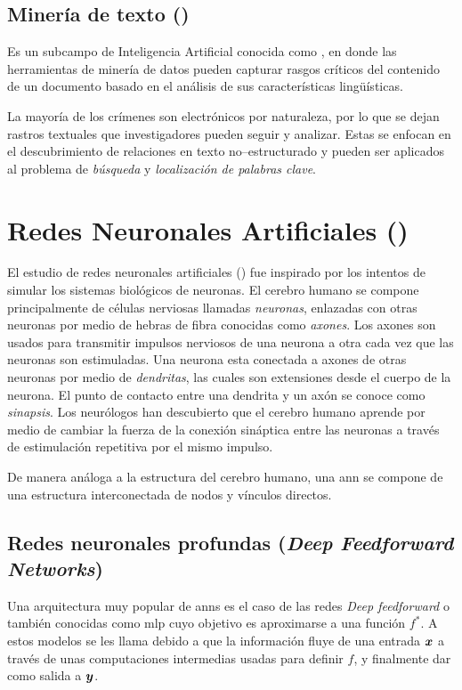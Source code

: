 \subsection{Minería de texto ()} \label{subsec:NLP}
Es un subcampo de Inteligencia Artificial conocida como , en donde las herramientas de minería de datos pueden capturar rasgos críticos del contenido de un documento basado en el análisis de sus características lingüísticas.

La mayoría de los crímenes son electrónicos por naturaleza, por lo que se dejan rastros textuales que investigadores pueden seguir y analizar. Estas se enfocan en el descubrimiento de relaciones en texto no--estructurado y pueden ser aplicados al problema de \emph{búsqueda} y \emph{localización de palabras clave}.


\section{Redes Neuronales Artificiales ()} \label{sec:ANN}
El estudio de redes neuronales artificiales () fue inspirado por los intentos de simular los sistemas biológicos de neuronas. El cerebro humano se compone principalmente de células nerviosas llamadas \emph{neuronas}, enlazadas con otras neuronas por medio de hebras de fibra conocidas como \emph{axones}. Los axones son usados para transmitir impulsos nerviosos de una neurona a otra cada vez que las neuronas son estimuladas. Una neurona esta conectada a axones de otras neuronas por medio de \emph{dendritas}, las cuales son extensiones desde el cuerpo de la neurona. El punto de contacto entre una dendrita y un axón se conoce como \emph{sinapsis}. Los neurólogos han descubierto que el cerebro humano aprende por medio de cambiar la fuerza de la conexión sináptica entre las neuronas a través de estimulación repetitiva por el mismo impulso.

De manera análoga a la estructura del cerebro humano, una \gls{ann} se compone de una estructura interconectada de nodos y vínculos directos.

\subsection{Redes neuronales profundas (\textsl{Deep Feedforward Networks})}
Una arquitectura muy popular de \glspl{ann} es el caso de las redes \textsl{Deep feedforward} o también conocidas como \gls{mlp} cuyo objetivo es aproximarse a una función $f^{\ast}$. A estos modelos se les llama  debido a que la información fluye de una entrada ${\bm{x}}$ a través de unas computaciones intermedias usadas para definir $f$, y finalmente dar como salida a ${\bm{y}}$.

